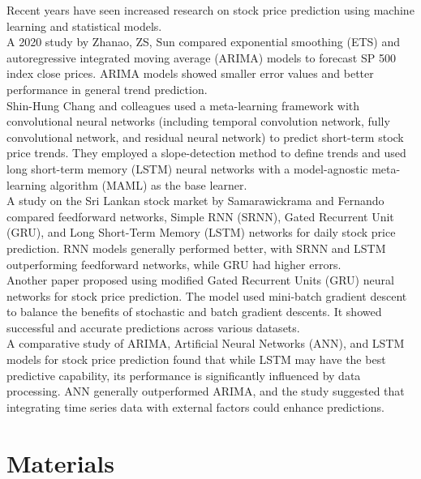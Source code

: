 \documentclass{ieeeojies}
\begin{document}
Recent years have seen increased research on stock price prediction using machine learning and statistical models.\\
A 2020 study by Zhanao, ZS, Sun\cite{b1} compared exponential smoothing (ETS) and autoregressive integrated moving average (ARIMA) models to forecast SP 500 index close prices. ARIMA models showed smaller error values and better performance in general trend prediction.\\
Shin-Hung Chang and colleagues used a meta-learning framework with convolutional neural networks (including temporal convolution network, fully convolutional network, and residual neural network) to predict short-term stock price trends\cite{b2}. They employed a slope-detection method to define trends and used long short-term memory (LSTM) neural networks with a model-agnostic meta-learning algorithm (MAML) as the base learner.\\
A study on the Sri Lankan stock market by Samarawickrama and Fernando \cite{b26} compared feedforward networks, Simple RNN (SRNN), Gated Recurrent Unit (GRU), and Long Short-Term Memory (LSTM) networks for daily stock price prediction. RNN models generally performed better, with SRNN and LSTM outperforming feedforward networks, while GRU had higher errors.\\
Another paper proposed using modified Gated Recurrent Units (GRU) neural networks for stock price prediction\cite{b5}. The model used mini-batch gradient descent to balance the benefits of stochastic and batch gradient descents. It showed successful and accurate predictions across various datasets.\\
A comparative study of ARIMA, Artificial Neural Networks (ANN), and LSTM models for stock price prediction found that while LSTM may have the best predictive capability, its performance is significantly influenced by data processing. ANN generally outperformed ARIMA, and the study suggested that integrating time series data with external factors could enhance predictions.\\
\section{Materials}
\end{document}

